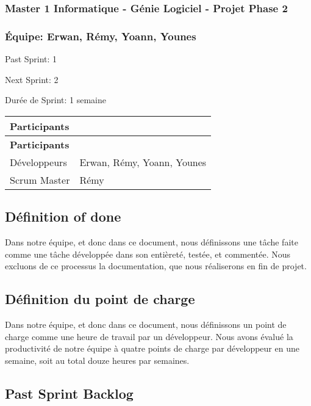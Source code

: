 \subsubsection*{Master 1 Informatique -\/ Génie Logiciel -\/ Projet Phase 2}

\subsubsection*{Équipe\+: Erwan, Rémy, Yoann, Younes}


\begin{DoxyItemize}
\item Past Sprint\+: 1
\item Next Sprint\+: 2
\item Durée de Sprint\+: 1 semaine
\end{DoxyItemize}

\tabulinesep=1mm
\begin{longtabu} spread 0pt [c]{*{2}{|X[-1]}|}
\hline
\rowcolor{\tableheadbgcolor}\textbf{ Participants }&\textbf{ }\\
\endfirsthead
\hline
\endfoot
\hline
\rowcolor{\tableheadbgcolor}\textbf{ Participants }&\textbf{ }\\
\endhead
Développeurs &Erwan, Rémy, Yoann, Younes \\
Scrum Master &Rémy \\
\end{longtabu}
\subsection*{Définition of done}

Dans notre équipe, et donc dans ce document, nous définissons une tâche faite comme une tâche développée dans son entièreté, testée, et commentée. Nous excluons de ce processus la documentation, que nous réaliserons en fin de projet.

\subsection*{Définition du point de charge}

Dans notre équipe, et donc dans ce document, nous définissons un point de charge comme une heure de travail par un développeur. Nous avons évalué la productivité de notre équipe à quatre points de charge par développeur en une semaine, soit au total douze heures par semaines.

\subsection*{Past Sprint Backlog}

